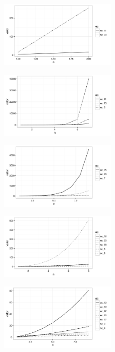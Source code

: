 \documentclass{article}
\begin{document}
\begin{figure}[H]
\centering
\includegraphics[width=0.5\textwidth]{img/graf_01.png}
\end{figure}

\begin{figure}[H]
\centering
\includegraphics[width=0.5\textwidth]{img/graf_02.png}
\end{figure}

\begin{figure}[H]
\centering
\includegraphics[width=0.5\textwidth]{img/graf_03.png}
\end{figure}

\begin{figure}[H]
\centering
\includegraphics[width=0.5\textwidth]{img/graf_04.png}
\end{figure}

\begin{figure}[H]
\centering
\includegraphics[width=0.5\textwidth]{img/graf_05.png}
\end{figure}
\end{document}

